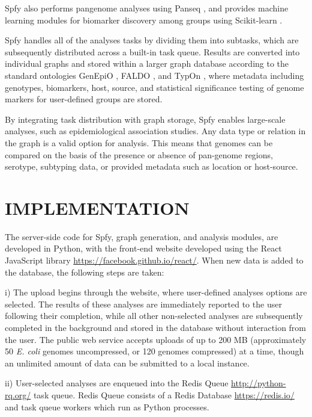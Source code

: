 \documentclass{article}
\begin{document}
Spfy also performs pangenome analyses using Panseq \cite{laing2010pan}, and provides machine learning modules for biomarker discovery among groups using Scikit-learn \cite{pedregosa2011scikit}.

Spfy handles all of the analyses tasks by dividing them into subtasks, which are subsequently distributed across a built-in task queue. Results are converted into individual graphs and stored within a larger graph database according to the standard ontologies GenEpiO \cite{griffiths2017context}, FALDO \cite{bolleman2016faldo}, and TypOn \cite{vaz2014typon}, where metadata including genotypes, biomarkers, host, source, and statistical significance testing of genome markers for user-defined groups are stored.

By integrating task distribution with graph storage, Spfy enables large-scale analyses, such as epidemiological association studies. Any data type or relation in the graph is a valid option for analysis. This means that genomes can be compared on the basis of the presence or absence of pan-genome regions, serotype, subtyping data, or provided metadata such as location or host-source.


\section{IMPLEMENTATION}
The server-side code for Spfy, graph generation, and analysis modules, are developed in Python, with the front-end website developed using the React JavaScript library \url{https://facebook.github.io/react/}. When new data is added to the database, the following steps are taken:

i) The upload begins through the website, where user-defined analyses options are selected. The results of these analyses are immediately reported to the user following their completion, while all other non-selected analyses are subsequently completed in the background and stored in the database without interaction from the user. The public web service accepts uploads of up to 200 MB (approximately 50 \textit {E. coli} genomes uncompressed, or 120 genomes compressed) at a time, though an unlimited amount of data can be submitted to a local instance.

ii) User-selected analyses are enqueued into the Redis Queue \url{http://python-rq.org/} task queue. Redis Queue consists of a Redis Database \url{https://redis.io/} and task queue workers which run as Python processes.
\end{document}
